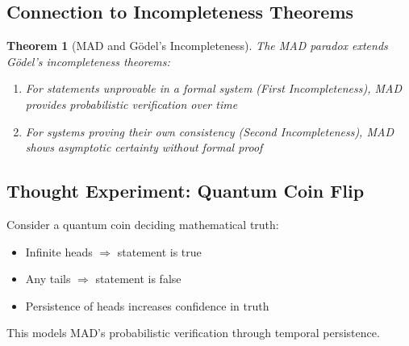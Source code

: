 \documentclass{article}
\newtheorem{theorem}{Theorem}
\begin{document}
\subsection{Connection to Incompleteness Theorems}
\begin{theorem}[MAD and Gödel's Incompleteness]
The MAD paradox extends Gödel's incompleteness theorems:
\begin{enumerate}
    \item For statements unprovable in a formal system (First Incompleteness), MAD provides probabilistic verification over time
    \item For systems proving their own consistency (Second Incompleteness), MAD shows asymptotic certainty without formal proof
\end{enumerate}
\end{theorem}

\subsection{Thought Experiment: Quantum Coin Flip}
Consider a quantum coin deciding mathematical truth:
\begin{itemize}
    \item Infinite heads $\Rightarrow$ statement is true
    \item Any tails $\Rightarrow$ statement is false
    \item Persistence of heads increases confidence in truth
\end{itemize}
This models MAD's probabilistic verification through temporal persistence.
\end{document}
